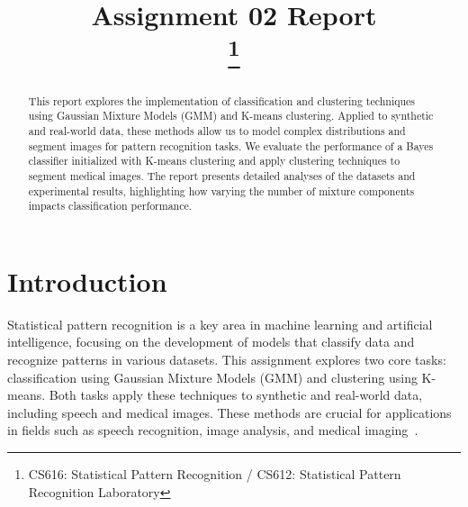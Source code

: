 \documentclass[conference]{IEEEtran}
\begin{document}
	
	\title{Assignment 02 Report \\
		\thanks{CS616: Statistical Pattern Recognition / CS612: Statistical Pattern Recognition Laboratory}
	}
	
	\author{
		\and
		\and
	}
	
	\maketitle
	
	\begin{abstract}
		This report explores the implementation of classification and clustering techniques using Gaussian Mixture Models (GMM) and K-means clustering. Applied to synthetic and real-world data, these methods allow us to model complex distributions and segment images for pattern recognition tasks. We evaluate the performance of a Bayes classifier initialized with K-means clustering and apply clustering techniques to segment medical images. The report presents detailed analyses of the datasets and experimental results, highlighting how varying the number of mixture components impacts classification performance.
	\end{abstract}
	
	\section{Introduction}
	
	Statistical pattern recognition is a key area in machine learning and artificial intelligence, focusing on the development of models that classify data and recognize patterns in various datasets. This assignment explores two core tasks: classification using Gaussian Mixture Models (GMM) and clustering using K-means. Both tasks apply these techniques to synthetic and real-world data, including speech and medical images. These methods are crucial for applications in fields such as speech recognition, image analysis, and medical imaging~\cite{bishop2006pattern}.
	
\end{document}
